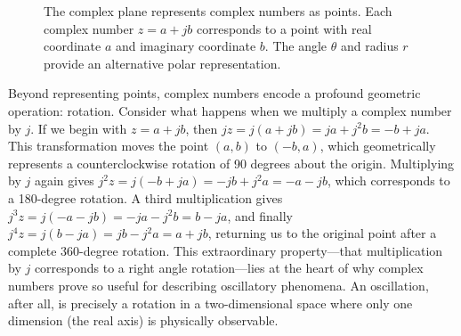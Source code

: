 \begin{figure}[htbp]
    \centering
    \caption{The complex plane represents complex numbers as points. Each complex number $z = a + jb$ corresponds to a point with real coordinate $a$ and imaginary coordinate $b$. The angle $\theta$ and radius $r$ provide an alternative polar representation.}
    \label{fig:complex_plane}
\end{figure}

Beyond representing points, complex numbers encode a profound geometric operation: rotation. Consider what happens when we multiply a complex number by $j$. If we begin with $z = a + jb$, then $jz = j(a + jb) = ja + j^2b = -b + ja$. This transformation moves the point $(a, b)$ to $(-b, a)$, which geometrically represents a counterclockwise rotation of 90 degrees about the origin. Multiplying by $j$ again gives $j^2z = j(-b + ja) = -jb + j^2a = -a - jb$, which corresponds to a 180-degree rotation. A third multiplication gives $j^3z = j(-a - jb) = -ja - j^2b = b - ja$, and finally $j^4z = j(b - ja) = jb - j^2a = a + jb$, returning us to the original point after a complete 360-degree rotation. This extraordinary property—that multiplication by $j$ corresponds to a right angle rotation—lies at the heart of why complex numbers prove so useful for describing oscillatory phenomena. An oscillation, after all, is precisely a rotation in a two-dimensional space where only one dimension (the real axis) is physically observable.

